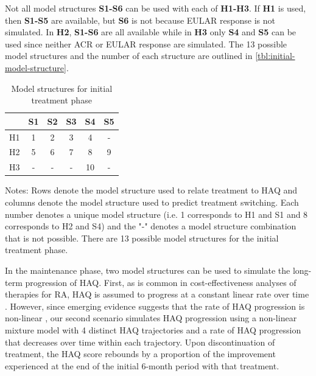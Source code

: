 \documentclass[11pt,final,fleqn]{article}\usepackage[]{graphicx}\usepackage[]{color}
\theoremstyle{plain}
\begin{document}
Not all model structures \textbf{S1-S6} can be used with each of \textbf{H1-H3}. If \textbf{H1} is used, then \textbf{S1-S5} are available, but \textbf{S6} is not because EULAR response is not simulated. In \textbf{H2}, \textbf{S1-S6} are all available while in \textbf{H3} only \textbf{S4} and \textbf{S5} can be used since neither ACR or EULAR response are simulated. The 13 possible model structures and the number of each structure are outlined in \autoref{tbl:initial-model-structure}.  

\begin{table}[!ht] 
\begin{center}
\begin{threeparttable}
\caption{Model structures for initial treatment phase} \label{tbl:initial-model-structure}
\begin{tabularx}{\textwidth}{@{\extracolsep{\fill}}lccccc}
\hline
\multicolumn{1}{l}{} & \multicolumn{1}{c}{S1} & \multicolumn{1}{c}{S2} & \multicolumn{1}{c}{S3} & \multicolumn{1}{c}{S4} & \multicolumn{1}{c}{S5}  \\
\hline
H1 & 1 & 2 & 3 & 4 & - \\
H2 & 5 & 6 & 7 & 8 & 9 \\
H3 & - & - & - & 10 & - \\
\hline
\end{tabularx}
\scriptsize
Notes: Rows denote the model structure used to relate treatment to HAQ and columns denote the model structure used to predict treatment switching. Each number denotes a unique model structure (i.e. 1 corresponds to H1 and S1 and 8 corresponds to H2 and S4) and the "-" denotes a model structure combination that is not possible. There are 13 possible model structures for the initial treatment phase. 
\end{threeparttable}
\end{center}
\end{table}


In the maintenance phase, two model structures can be used to simulate the long-term progression of HAQ. First, as is common in cost-effectiveness analyses of therapies for RA, HAQ is assumed to progress at a constant linear rate over time \citep[see][]{tosh2011sheffield, wailoo2008biologic}. However, since emerging evidence suggests that the rate of HAQ progression is non-linear \citep{gibson2016haq}, our second scenario simulates HAQ progression using a non-linear mixture model \citep{norton2014health} with 4 distinct HAQ trajectories and a rate of HAQ progression that decreases over time within each trajectory. Upon discontinuation of treatment, the HAQ score rebounds by a proportion of the improvement experienced at the end of the initial 6-month period with that treatment.
\end{document}
